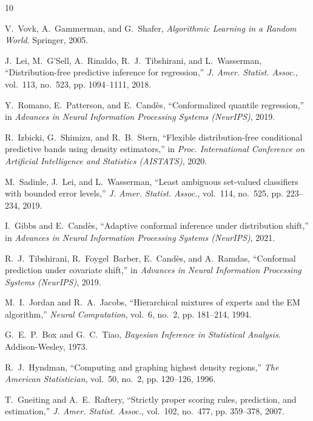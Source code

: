 \documentclass[10pt,twocolumn,a4paper]{article}
\begin{document}
\begin{thebibliography}{10}

V.~Vovk, A.~Gammerman, and G.~Shafer, \emph{Algorithmic Learning in a Random World}. Springer, 2005.

J.~Lei, M.~G'Sell, A.~Rinaldo, R.~J.~Tibshirani, and L.~Wasserman, ``Distribution-free predictive
inference for regression,'' \emph{J. Amer. Statist. Assoc.}, vol.~113, no.~523, pp. 1094--1111,
2018.

Y.~Romano, E.~Patterson, and E.~Cand\`es, ``Conformalized quantile regression,'' in \emph{Advances
in Neural Information Processing Systems (NeurIPS)}, 2019.

R.~Izbicki, G.~Shimizu, and R.~B.~Stern, ``Flexible distribution-free conditional predictive bands
using density estimators,'' in \emph{Proc. International Conference on Artificial Intelligence and
Statistics (AISTATS)}, 2020.

M.~Sadinle, J.~Lei, and L.~Wasserman, ``Least ambiguous set-valued classifiers with bounded error
levels,'' \emph{J. Amer. Statist. Assoc.}, vol.~114, no.~525, pp. 223--234, 2019.

I.~Gibbs and E.~Cand\`es, ``Adaptive conformal inference under distribution shift,'' in
\emph{Advances in Neural Information Processing Systems (NeurIPS)}, 2021.

R.~J.~Tibshirani, R.~Foygel~Barber, E.~Cand\`es, and A.~Ramdas, ``Conformal prediction under
covariate shift,'' in \emph{Advances in Neural Information Processing Systems (NeurIPS)}, 2019.

M.~I.~Jordan and R.~A.~Jacobs, ``Hierarchical mixtures of experts and the EM algorithm,''
\emph{Neural Computation}, vol.~6, no.~2, pp. 181--214, 1994.

G.~E.~P.~Box and G.~C.~Tiao, \emph{Bayesian Inference in Statistical Analysis}. Addison-Wesley,
1973.

R.~J.~Hyndman, ``Computing and graphing highest density regions,'' \emph{The American
Statistician}, vol.~50, no.~2, pp. 120--126, 1996.

T.~Gneiting and A.~E.~Raftery, ``Strictly proper scoring rules, prediction, and estimation,''
\emph{J. Amer. Statist. Assoc.}, vol.~102, no.~477, pp. 359--378, 2007.


\end{thebibliography}
\end{document}
